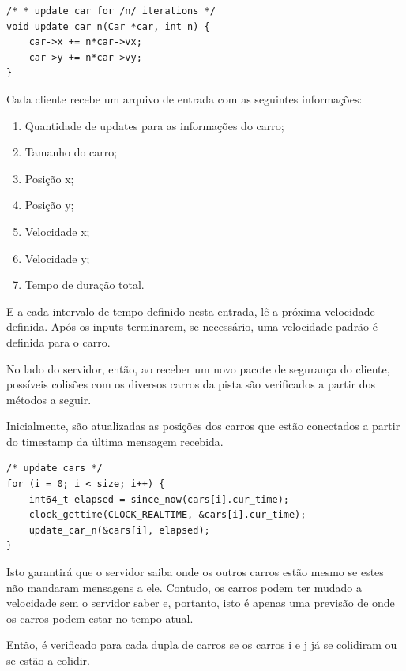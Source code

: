 \documentclass[10pt,twocolumn,letterpaper]{article}
\begin{document}
\begin{lstlisting}[caption={Código para a atualização de um carro}, label=Algorithm]
/* * update car for /n/ iterations */
void update_car_n(Car *car, int n) {
    car->x += n*car->vx;
    car->y += n*car->vy;
}
\end{lstlisting}

    Cada cliente recebe um arquivo de entrada com as seguintes informações:

    \begin{enumerate}
        \item Quantidade de updates para as informações do carro;
        \item Tamanho do carro;
        \item Posição x;
        \item Posição y;
        \item Velocidade x;
        \item Velocidade y;
        \item Tempo de duração total.
    \end{enumerate}

    E a cada intervalo de tempo definido nesta entrada, lê a próxima velocidade definida. Após os inputs terminarem, se necessário, uma velocidade padrão é definida para o carro.

    No lado do servidor, então, ao receber um novo pacote de segurança do cliente, possíveis colisões com os diversos carros da pista são verificados a partir dos métodos a seguir.

    Inicialmente, são atualizadas as posições dos carros que estão conectados a partir do timestamp da última mensagem recebida.

\begin{lstlisting}[caption={Código para atualização dos carros}, label=Algorithm]
/* update cars */
for (i = 0; i < size; i++) {
    int64_t elapsed = since_now(cars[i].cur_time);
    clock_gettime(CLOCK_REALTIME, &cars[i].cur_time);
    update_car_n(&cars[i], elapsed);
}
\end{lstlisting}

    Isto garantirá que o servidor saiba onde os outros carros estão mesmo se estes não mandaram mensagens a ele. Contudo, os carros podem ter mudado a velocidade sem o servidor saber e, portanto, isto é apenas uma previsão de onde os carros podem estar no tempo atual.
    
    Então,  é verificado para cada dupla de carros se os carros i e j já se colidiram ou se estão a colidir.
\end{document}
